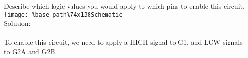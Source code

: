 Describe which logic values you would apply to which pins to enable this circuit.
\texttt{[image: \%base path\%74x138Schematic]} \\

Solution: \\ \\
To enable this circuit, we need to apply a HIGH signal to G1, and LOW signals to G2A and G2B.
